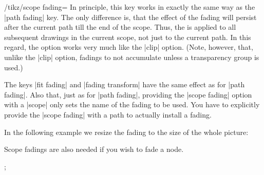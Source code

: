 \begin{key}{/tikz/scope fading=}
    In principle, this key works in exactly the same way as the |path fading|
    key. The only difference is, that the effect of the fading will persist
    after the current path till the end of the scope. Thus, the 
    is applied to all subsequent drawings in the current scope, not just to the
    current path. In this regard, the option works very much like the |clip|
    option. (Note, however, that, unlike the |clip| option, fadings to not
    accumulate unless a transparency group is used.)

    The keys |fit fading| and |fading transform| have the same effect as for
    |path fading|. Also that, just as for |path fading|, providing the
    |scope fading| option with a |{scope}| only sets the name of the fading to
    be used. You have to explicitly provide the |scope fading| with a path to
    actually install a fading.
\begin{codeexample}[preamble={\usetikzlibrary{fadings,patterns}}]
\end{codeexample}

    In the following example we resize the fading to the size of the whole
    picture:
\begin{codeexample}[preamble={\usetikzlibrary{fadings,patterns}}]
\end{codeexample}

    Scope fadings are also needed if you wish to fade a node.
\begin{codeexample}[preamble={\usetikzlibrary{fadings}}]
\tikz {};
\end{codeexample}
\end{key}


